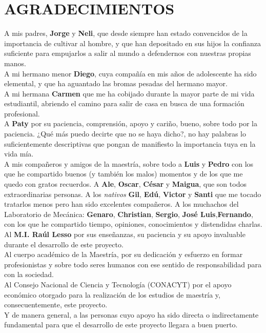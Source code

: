 \chapter*{AGRADECIMIENTOS}

\vspace{-5mm}

A mis padres, \textbf{Jorge} y \textbf{Neli}, que desde siempre han estado convencidos de la importancia de cultivar al hombre, y que 
han depositado en sus hijos la confianza suficiente para empujarlos a salir al mundo a 
defendernos con nuestras propias manos.\\[-2mm]

A mi hermano menor \textbf{Diego}, cuya compañía en mis años de adolescente ha sido elemental, y que ha 
aguantado las bromas pesadas del hermano mayor.\\[-2mm]

A mi hermana \textbf{Carmen} que me ha cobijado durante la mayor parte de mi vida estudiantil, 
abriendo el camino para salir de casa en busca de una formación profesional.\\[-2mm]

A \textbf{Paty} por su paciencia, comprensión, apoyo y cariño, bueno, sobre todo por la paciencia. ¿Qué más 
puedo decirte que no se haya dicho?, no hay palabras lo suficientemente descriptivas que pongan de manifiesto 
la importancia tuya en la vida mía. \\ [-2mm]

A mis compañeros y amigos de la maestría, sobre todo a  \textbf{Luis} y \textbf{Pedro} con los que he compartido buenos (y también los malos) momentos y de los que me quedo con gratos recuerdos. A \textbf{Ale}, \textbf{Oscar}, \textbf{César} y \textbf{Maigua}, que son todos extraordinarias personas. A los \textit{nativos} \textbf{Gil}, \textbf{Edú}, \textbf{Victor} y \textbf{Santi} que me tocado tratarlos menos pero han sido excelentes compañeros. A los muchachos del Laboratorio de Mecánica: \textbf{Genaro}, \textbf{Christian}, \textbf{Sergio}, \textbf{José Luis},\textbf{Fernando}, con los que he compartido tiempo, opiniones, conocimientos y distendidas charlas.\\[-2mm]

Al \textbf{M.I. Raúl Lesso} por sus enseñanzas, su paciencia y su apoyo invaluable durante el desarrollo de este proyecto.\\[-2mm]

Al cuerpo académico de la Maestría, por su dedicación y esfuerzo en formar profesionistas y sobre todo 
seres humanos con ese sentido de responsabilidad para con la sociedad.\\ [-2mm]

Al Consejo Nacional de Ciencia y Tecnología (CONACYT) por el apoyo económico otorgado para la realización de los estudios 
de maestría y, consecuentemente, este proyecto.\\ [-2mm]

Y de manera general, a las personas cuyo apoyo ha sido directa o indirectamente fundamental para 
que el desarrollo de este proyecto llegara a buen puerto.
